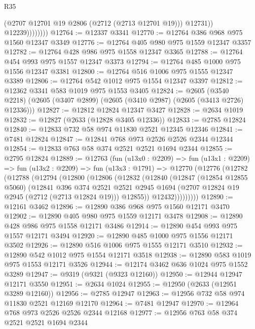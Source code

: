 \begin{lexlean}{R35}
\begin{coremodule}
                        (@2707 @12701 @19 @2806 (@2712 (@2713 @12701 @19)))
                        @12731))
                    @12239))))))))
@12764 := @12337 @3341
@12770 := @12764 @386 @968 @975 @1560 @12347 @3349
@12776 := @12764 @405 @980 @975 @1559 @12347 @3357
@12782 := @12764 @428 @986 @975 @1558 @12347 @3365
@12788 := @12764 @454 @993 @975 @1557 @12347 @3373
@12794 := @12764 @485 @1000 @975 @1556 @12347 @3381
@12800 := @12764 @516 @1006 @975 @1555 @12347 @3389
@12806 := @12764 @542 @1012 @975 @1554 @12347 @3397
@12812 := @12362 @3341 @583 @1019 @975 @1553 @3405
@12824 := @2605
    (@3540 @2218)
    (@2605 (@3407 @2899) (@2605 (@3410 @2987) (@2605 (@3413 @2726) @12336)))
@12827 := @12812 @12824 @12347 @3427
@12828 := @2634 @1019
@12832 := @12827 (@2633 (@12828 @3405 @12336))
@12833 := @2785 @12824
@12840 := @12833 @732 @58 @974 @11830 @2521 @12345 @12346
@12841 := @7481 @12824
@12847 := @12841 @768 @973 @2526 @2526 @2344 @12344
@12854 := @12833 @763 @58 @374 @2521 @2521 @1694 @2344
@12855 := @2795 @12824
@12889 := @12763
    (fun (u13x0 : @2209) =>
    fun (u13x1 : @2209) =>
    fun (u13x2 : @2209) =>
    fun (u13x3 : @1791) =>
    @12770
      (@12776
        (@12782
          (@12788
            (@12794
              (@12800
                (@12806
                  (@12832
                    (@12840
                      (@12847
                        (@12854 @12855 @5060)
                        (@12841
                          @396
                          @374
                          @2521
                          @2521
                          @2945
                          @1694
                          (@2707 @12824 @19 @2945 (@2712 (@2713 @12824 @19)))
                          @12855))
                      @12432)))))))))
@12890 := @12161 @3462
@12896 := @12890 @386 @968 @975 @1560 @12171 @3470
@12902 := @12890 @405 @980 @975 @1559 @12171 @3478
@12908 := @12890 @428 @986 @975 @1558 @12171 @3486
@12914 := @12890 @454 @993 @975 @1557 @12171 @3494
@12920 := @12890 @485 @1000 @975 @1556 @12171 @3502
@12926 := @12890 @516 @1006 @975 @1555 @12171 @3510
@12932 := @12890 @542 @1012 @975 @1554 @12171 @3518
@12938 := @12890 @583 @1019 @975 @1553 @12171 @3526
@12944 := @12174 @3462 @636 @1024 @975 @1552 @3289
@12947 := @9319 (@9321 (@9323 @12160))
@12950 := @12944 @12947 @12171 @3550
@12951 := @2634 @1024
@12955 := @12950 (@2633 (@12951 @3289 @12160))
@12956 := @2785 @12947
@12963 := @12956 @732 @58 @974 @11830 @2521 @12169 @12170
@12964 := @7481 @12947
@12970 := @12964 @768 @973 @2526 @2526 @2344 @12168
@12977 := @12956 @763 @58 @374 @2521 @2521 @1694 @2344

\end{coremodule}
\end{lexlean}
